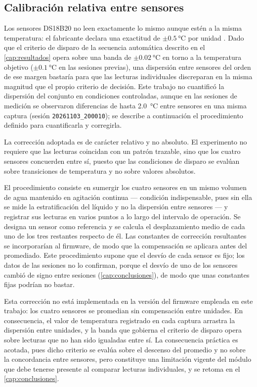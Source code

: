 \subsection*{Calibración relativa entre sensores}

Los sensores DS18B20 no leen exactamente lo mismo aunque estén a la
misma temperatura: el fabricante declara una exactitud de
$\pm\SI{0.5}{\celsius}$ por unidad \cite{MaximDS18B20}. Dado que el criterio de disparo de la secuencia automática
descrito en el \cref{cap:resultados} opera sobre una banda de
$\pm\SI{0.02}{\celsius}$ en torno a la temperatura objetivo
($\pm\SI{0.1}{\celsius}$ en las sesiones previas), una
dispersión entre sensores del orden de ese margen bastaría para que
las lecturas individuales discreparan en la misma magnitud que el
propio criterio de decisión. Este trabajo no cuantificó la dispersión
del conjunto en condiciones controladas, aunque en las sesiones de
medición se observaron diferencias de hasta \SI{2.0}{\celsius} entre
sensores en una misma captura (sesión \texttt{20261103\_200010}); se
describe a continuación el procedimiento definido para cuantificarla y
corregirla.

La corrección adoptada es de carácter relativo y no absoluto. El
experimento no requiere que las lecturas coincidan con un patrón
trazable, sino que los cuatro sensores concuerden entre sí, puesto que
las condiciones de disparo se evalúan sobre transiciones de
temperatura y no sobre valores absolutos.

El procedimiento consiste en sumergir los cuatro sensores en un mismo
volumen de agua mantenido en agitación continua --- condición
indispensable, pues sin ella se mide la estratificación del líquido y
no la dispersión entre sensores --- y registrar sus lecturas en
varios puntos a lo largo del intervalo de operación. Se designa un
sensor como referencia y se calcula el desplazamiento medio de cada
uno de los tres restantes respecto de él. Las constantes de corrección
resultantes se incorporarían al firmware, de modo que la compensación
se aplicara antes del promediado. Este procedimiento supone que el
desvío de cada sensor es fijo; los datos de las sesiones no lo
confirman, porque el desvío de uno de los sensores cambió de signo
entre sesiones (\cref{cap:conclusiones}), de modo que unas constantes
fijas podrían no bastar.

Esta corrección no está implementada en la versión del firmware
empleada en este trabajo: los cuatro sensores se promedian sin
compensación entre unidades. En consecuencia, el valor de temperatura
registrado en cada captura arrastra la dispersión entre unidades, y la
banda que gobierna el criterio de
disparo opera sobre lecturas que no han sido igualadas entre sí. La
consecuencia práctica es acotada, pues dicho criterio se evalúa sobre
el descenso del promedio y no sobre la concordancia entre sensores,
pero constituye una limitación vigente del módulo que debe tenerse
presente al comparar lecturas individuales, y se retoma en el
\cref{cap:conclusiones}.

